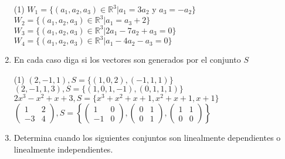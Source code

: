 \documentclass[letterpaper,11pt]{article}
\begin{document}
\begin{enumerate}
\begin{tasks}(1)
\task $W_{1} = \lbrace (a_{1},a_{2},a_{3}) \in \mathbb{R}^{3} \big\vert  a_{1}=3a_{2}$ y $a_{3}=-a_{2} \rbrace$
\task $W_{2} = \lbrace (a_{1},a_{2},a_{3}) \in \mathbb{R}^{3} \big\vert  a_{1} = a_{3} + 2 \rbrace$
\task $W_{3} = \lbrace (a_{1},a_{2},a_{3}) \in \mathbb{R}^{3} \big\vert  2a_{1} - 7a_{2} + a_{3} = 0 \rbrace$
\task $W_{4} = \lbrace (a_{1},a_{2},a_{3}) \in \mathbb{R}^{3} \big\vert  a_{1} - 4a_{2} - a_{3} = 0 \rbrace$
\end{tasks}
\item En cada caso diga si los vectores son generados por el conjunto $S$

\begin{tasks}(1)
\task $(2,-1,1), S =  \lbrace (1,0,2),(-1,1,1) \rbrace$
\task $(2,-1,1,3), S =  \lbrace (1,0,1,-1),(0,1,1,1) \rbrace$
\task $2x^3 - x^2 + x + 3, S =  \lbrace x^3 + x^2 + x +1, x^2 + x +1, x +1 \rbrace$
\task $ \begin{pmatrix} 1 & 2 \\ -3 & 4 \end{pmatrix},  S =  \left \lbrace \begin{pmatrix} 1 & 0 \\ -1 & 0 \end{pmatrix} , \begin{pmatrix} 0 & 1 \\ 0 &1 \end{pmatrix} , \begin{pmatrix} 1 & 1 \\ 0 &0 \end{pmatrix} \right \rbrace$
\end{tasks}


\item Determina cuando los siguientes conjuntos son linealmente dependientes o linealmente independientes.


\end{enumerate}
\end{document}
